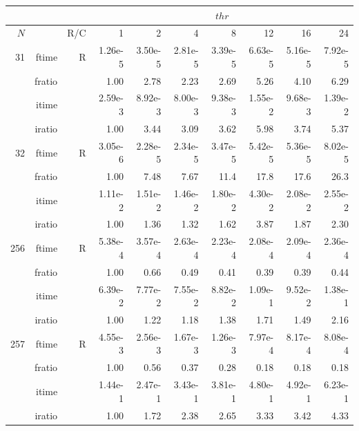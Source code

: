 \documentclass[a4paper]{article}
\begin{document}
\begin{table}
\begin{center}
\begin{tabular}{|r|r|r|r|r|r|r|r|r|r|}
\hline 
     \multicolumn{3}{|c|}{ } & \multicolumn{7}{c|}{$thr$} \\ \hline
    $N$  & & R/C  & 1           & 2    & 4    & 8    & 12   & 16    & 24  \\ \hline\hline
    31  & ftime & R  &  1.26e-5 &   3.50e-5 &   2.81e-5 &   3.39e-5 &   6.63e-5 &   5.16e-5 &   7.92e-5   \\ 
      & fratio & &      1.00 &   2.78 &   2.23 &   2.69 &   5.26 &   4.10 &   6.29     \\ 
     & itime & &        2.59e-3 &   8.92e-3 &   8.00e-3 &   9.38e-3 &   1.55e-2 &   9.68e-3 &   1.39e-2     \\ 
     & iratio & &       1.00 &   3.44 &   3.09 &   3.62 &   5.98 &   3.74 &   5.37      \\ \hline 
    32  & ftime & R  &  3.05e-6 &   2.28e-5 &   2.34e-5 &   3.47e-5 &   5.42e-5 &   5.36e-5 &   8.02e-5   \\ 
      & fratio & &      1.00 &   7.48 &   7.67 &   11.4 &   17.8 &   17.6 &   26.3     \\ 
     & itime & &        1.11e-2 &   1.51e-2 &   1.46e-2 &   1.80e-2 &   4.30e-2 &   2.08e-2 &   2.55e-2     \\ 
     & iratio & &       1.00 &   1.36 &   1.32 &   1.62 &   3.87 &   1.87 &   2.30      \\ \hline 
   256  & ftime & R  &  5.38e-4 &   3.57e-4 &   2.63e-4 &   2.23e-4 &   2.08e-4 &   2.09e-4 &   2.36e-4   \\ 
      & fratio & &      1.00 &   0.66 &   0.49 &   0.41 &   0.39 &   0.39 &   0.44     \\ 
     & itime & &        6.39e-2 &   7.77e-2 &   7.55e-2 &   8.82e-2 &   1.09e-1 &   9.52e-2 &   1.38e-1     \\ 
     & iratio & &       1.00 &   1.22 &   1.18 &   1.38 &   1.71 &   1.49 &   2.16      \\ \hline 
   257  & ftime & R  &  4.55e-3 &   2.56e-3 &   1.67e-3 &   1.26e-3 &   7.97e-4 &   8.17e-4 &   8.08e-4   \\ 
      & fratio & &      1.00 &   0.56 &   0.37 &   0.28 &   0.18 &   0.18 &   0.18     \\ 
     & itime & &        1.44e-1 &   2.47e-1 &   3.43e-1 &   3.81e-1 &   4.80e-1 &   4.92e-1 &   6.23e-1     \\ 
     & iratio & &       1.00 &   1.72 &   2.38 &   2.65 &   3.33 &   3.42 &   4.33      \\ \hline 

\end{tabular}
\end{center}
\end{table}
\end{document}
